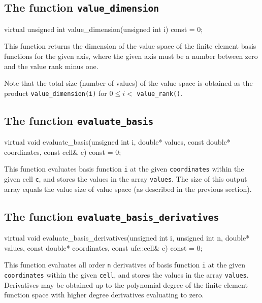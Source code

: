 \subsection{The function \texttt{value\_dimension}}

\begin{code}
virtual unsigned int
value_dimension(unsigned int i) const = 0;
\end{code}

This function returns the dimension of the value space of the finite
element basis functions for the given axis, where the given axis must
be a number between zero and the value rank minus one.

Note that the total size (number of values) of the value space is
obtained as the product \texttt{value\_dimension(i)} for $0 \le i <$
\texttt{value\_rank()}.

\subsection{The function \texttt{evaluate\_basis}}

\begin{code}
virtual void evaluate_basis(unsigned int i,
                            double* values,
                            const double* coordinates,
                            const cell& c) const = 0;
\end{code}

This function evaluates basis function \texttt{i} at the given
\texttt{coordinates} within the given cell \texttt{c}, and stores the
values in the array \texttt{values}. The size of this output array
equals the value size of value space (as described in the previous
section).

\subsection{The function \texttt{evaluate\_basis\_derivatives}}

\begin{code}
virtual void
evaluate_basis_derivatives(unsigned int i,
                           unsigned int n,
                           double* values,
                           const double* coordinates,
                           const ufc::cell& c) const = 0;
\end{code}

This function evaluates all order \texttt{n} derivatives of basis
function \texttt{i} at the given \texttt{coordinates} within the given
\texttt{cell}, and stores the values in the array \texttt{values}.
Derivatives may be obtained up to the polynomial degree of the finite
element function space with higher degree derivatives evaluating to
zero.

